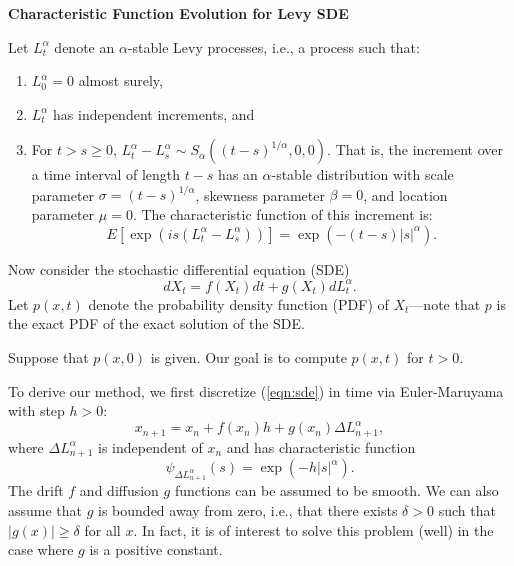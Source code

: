 \documentclass[11pt,letterpaper]{article}
\begin{document}
\begin{center}
\textbf{Characteristic Function Evolution for Levy SDE}
\end{center}

\noindent Let $L_t^{\alpha}$ denote an $\alpha$-stable Levy processes, i.e., a process such that:
\begin{enumerate}
\item $L_0^\alpha = 0$ almost surely,
\item $L_t^\alpha$ has independent increments, and
\item For $t > s \geq 0$, $L_t^\alpha - L_s^\alpha \sim S_\alpha((t-s)^{1/\alpha},0,0)$.  That is, the increment over a time interval of length $t-s$ has an $\alpha$-stable distribution with scale parameter $\sigma = (t-s)^{1/\alpha}$, skewness parameter $\beta=0$, and location parameter $\mu=0$.  The characteristic function of this increment is:
\begin{equation}
\label{eqn:cfinc}
E[\exp(i s (L_t^\alpha - L_s^\alpha))] = \exp(-(t-s) |s|^\alpha).
\end{equation}
\end{enumerate}

\noindent Now consider the stochastic differential equation (SDE)
\begin{equation}
\label{eqn:sde}
dX_t = f(X_t) dt + g(X_t) dL_t^{\alpha}.
\end{equation}
Let $p(x,t)$ denote the probability density function (PDF) of $X_t$---note that $p$ is the exact PDF of the exact solution of the SDE.

Suppose that $p(x,0)$ is given.  Our goal is to compute $p(x,t)$ for $t > 0$.

To derive our method, we first discretize (\ref{eqn:sde}) in time via Euler-Maruyama with step $h > 0$:
\begin{equation}
\label{eqn:em}
x_{n+1} = x_n + f(x_{n}) h + g(x_{n}) \Delta L_{n+1}^{\alpha},
\end{equation}
where $\Delta L_{n+1}^{\alpha}$ is independent of $x_n$ and has characteristic function
\begin{equation}
\label{eqn:emchar}
\psi_{\Delta L^{\alpha}_{n+1}}(s) = \exp(- h |s|^\alpha).
\end{equation}
The drift $f$ and diffusion $g$ functions can be assumed to be smooth.  We can also assume that $g$ is bounded away from zero, i.e., that there exists $\delta > 0$ such that $|g(x)| \geq \delta$ for all $x$.  In fact, it is of interest to solve this problem (well) in the case where $g$ is a positive constant.
\end{document}
